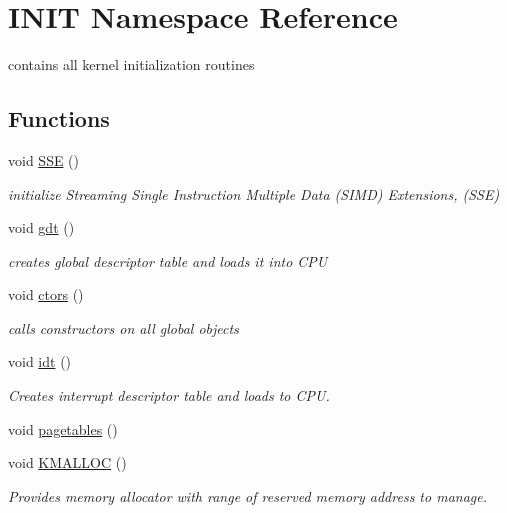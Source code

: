 \hypertarget{namespace_i_n_i_t}{}\section{I\+N\+IT Namespace Reference}
\label{namespace_i_n_i_t}


contains all kernel initialization routines  


\subsection*{Functions}
\begin{DoxyCompactItemize}
\item 
void \hyperlink{namespace_i_n_i_t_a8928ddbb4ca671dfe1c740da380fa0c4}{S\+SE} ()
\begin{DoxyCompactList}\small\item\em initialize Streaming Single Instruction Multiple Data (S\+I\+MD) Extensions, (S\+SE) \end{DoxyCompactList}\item 
void \hyperlink{namespace_i_n_i_t_a3462d7bc51bce77cc240d05b62b1b777}{gdt} ()
\begin{DoxyCompactList}\small\item\em creates global descriptor table and loads it into C\+PU \end{DoxyCompactList}\item 
void \hyperlink{namespace_i_n_i_t_a6608557e41ad37cdb4a408e2f05c9783}{ctors} ()
\begin{DoxyCompactList}\small\item\em calls constructors on all global objects \end{DoxyCompactList}\item 
void \hyperlink{namespace_i_n_i_t_aec8e9f01cb09653075b6e610096b3ca9}{idt} ()
\begin{DoxyCompactList}\small\item\em Creates interrupt descriptor table and loads to C\+PU. \end{DoxyCompactList}\item 
void \hyperlink{namespace_i_n_i_t_a9e427aa89bec95f574ad21b5e7d9ee8c}{pagetables} ()
\item 
void \hyperlink{namespace_i_n_i_t_ac811302ce0948a6a097b445b811f9c14}{K\+M\+A\+L\+L\+OC} ()
\begin{DoxyCompactList}\small\item\em Provides memory allocator with range of reserved memory address to manage. \end{DoxyCompactList}\item 

\end{DoxyCompactItemize}
